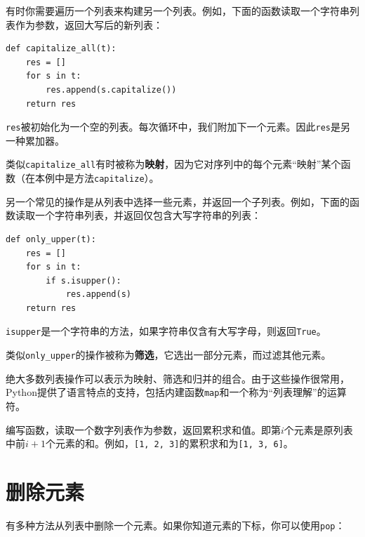 

有时你需要遍历一个列表来构建另一个列表。例如，下面的函数读取一个字符串列表作为参数，返回大写后的新列表：

\beforeverb
\begin{verbatim}
def capitalize_all(t):
    res = []
    for s in t:
        res.append(s.capitalize())
    return res
\end{verbatim}
\afterverb
%
{\tt res}被初始化为一个空的列表。每次循环中，我们附加下一个元素。因此{\tt res}是另一种累加器。

类似\verb"capitalize_all"有时被称为{\bf 映射}，因为它对序列中的每个元素“映射”某个函数（在本例中是方法{\tt capitalize}）。


另一个常见的操作是从列表中选择一些元素，并返回一个子列表。例如，下面的函数读取一个字符串列表，并返回仅包含大写字符串的列表：

\beforeverb
\begin{verbatim}
def only_upper(t):
    res = []
    for s in t:
        if s.isupper():
            res.append(s)
    return res
\end{verbatim}
\afterverb
%
{\tt isupper}是一个字符串的方法，如果字符串仅含有大写字母，则返回{\tt True}。

类似\verb"only_upper"的操作被称为{\bf 筛选}，它选出一部分元素，而过滤其他元素。

绝大多数列表操作可以表示为映射、筛选和归并的组合。由于这些操作很常用，Python提供了语言特点的支持，包括内建函数{\tt map}和一个称为“列表理解”的运算符。


\begin{ex}
\label{累积}

编写函数，读取一个数字列表作为参数，返回累积求和值。即第$i$个元素是原列表中前$i+1$个元素的和。例如，{\tt [1, 2, 3]}的累积求和为{\tt [1, 3, 6]}。
\end{ex}


\section{删除元素}


有多种方法从列表中删除一个元素。如果你知道元素的下标，你可以使用{\tt pop}：



